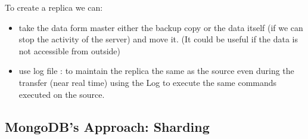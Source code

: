 \documentclass[a4page, 11pt]{article}
\begin{document}
To create a replica we can:
\begin{itemize}[noitemsep]
	\item take the data form master either the backup copy or the data itself	(if we can stop the activity of the server) and move it. (It could be useful if the data is not accessible from outside)
	\item use log file : to maintain the replica the same as the source even during the transfer (near real time) using the Log to execute the same commands executed on the source.
\end{itemize}


\subsection{MongoDB's Approach: Sharding\cite{ScalingMongoDB}}
\end{document}
